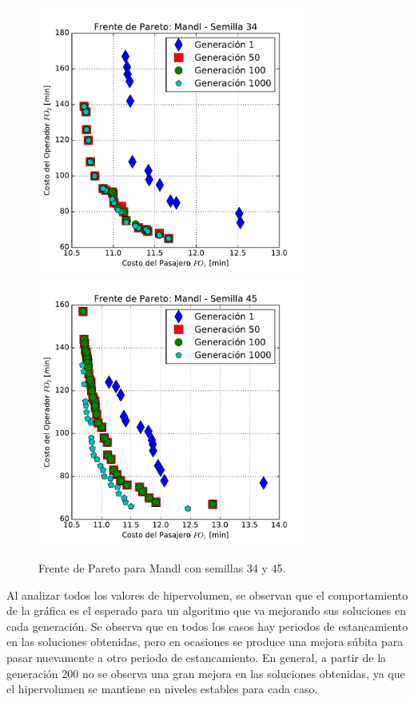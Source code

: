 \begin{figure}[p]
\centering
\includegraphics[width=0.79\textwidth]{img/frente_Mandl_s34}
\includegraphics[width=0.79\textwidth]{img/frente_Mandl_s45}
\caption{Frente de Pareto para Mandl con semillas 34 y 45.}
\label{fig:paretoMandl2}
\end{figure}

Al analizar todos los valores de hipervolumen, se observan que el comportamiento de la gráfica es el esperado para un algoritmo que va mejorando sus soluciones en cada generación. Se observa que en todos los casos hay periodos de estancamiento en las soluciones obtenidas, pero en ocasiones se produce una mejora súbita para pasar nuevamente a otro periodo de estancamiento. En general, a partir de la generación 200 no se observa una gran mejora en las soluciones obtenidas, ya que el hipervolumen se mantiene en niveles estables para cada caso.

